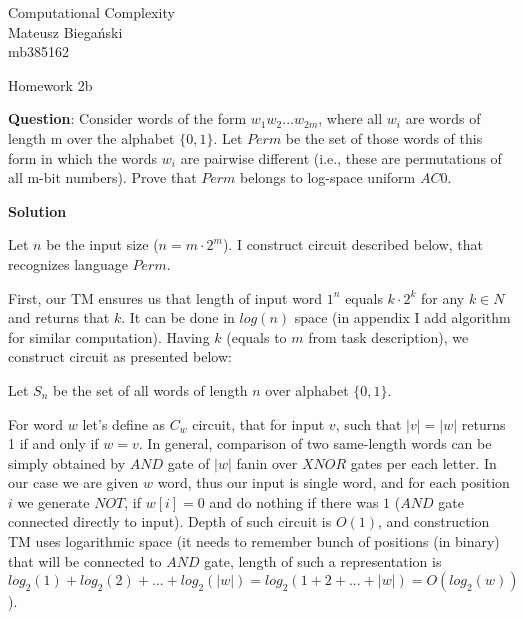 \documentclass[12pt]{article}
\begin{document}

\begin{flushright}
    Computational Complexity \\
    Mateusz Biegański \\ 
    mb385162
\end{flushright}

\begin{center}
    \Large Homework 2b \normalsize
\end{center}

\textbf{Question}:
Consider words of the form $w_1w_2 ...w_{2m}$, where all $w_i$ are words of
length m over the alphabet $\{0, 1\}$. Let $Perm$ be the set of those words of this form in which the
words $w_i$ are pairwise different (i.e., these are permutations of all m-bit numbers). Prove that
$Perm$ belongs to log-space uniform $AC0$.



{\bf Solution}

Let $n$ be the input size ($n = m \cdot 2^m$). I construct circuit described below, that recognizes language $Perm$.

First, our TM ensures us that length of input word $1^n$ equals $k\cdot2^k$ for any $k \in N$ and returns that $k$. It can be done in $log(n)$ space (in appendix I add algorithm for similar computation).
Having $k$ (equals to $m$ from task description), we construct circuit as presented below:

Let $S_n$ be the set of all words of length $n$ over alphabet $\{0,1\}$.

For word $w$ let's define as $C_w$ circuit, that for input $v$, such that $|v| = |w|$ returns 1 if and only if $w = v$. In general, comparison of two same-length words can be simply obtained by $AND$ gate of $|w|$ fanin over $XNOR$ gates per each letter. In our case we are given $w$ word, thus our input is single word, and for each position $i$ we generate $NOT$, if $w[i] = 0$ and do nothing if there was $1$ ($AND$ gate connected directly to input).
Depth of such circuit is $O(1)$, and construction TM uses logarithmic space (it needs to remember bunch of positions (in binary) that will be connected to $AND$ gate, length of such a representation is $log_2(1) + log_2(2) + ... + log_2(|w|) = log_2(1+2+...+|w|) = O(log_2(w))$).
\end{document}
